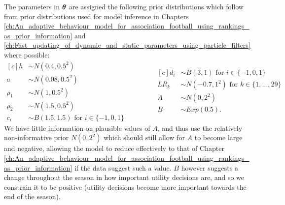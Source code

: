 The parameters in \(\boldsymbol{\theta}\) are assigned the following prior distributions which follow from prior distributions
used for model inference in Chapters
\ref{ch:An_adaptive_behaviour_model_for_association_football_using_rankings_as_prior_information} and
\ref{ch:Fast_updating_of_dynamic_and_static_parameters_using_particle_filters} where possible:
\begin{equation}
\begin{aligned}[c]
h &\sim N(0.4, 0.5^2) \\
a &\sim N(0.08, 0.5^2) \\
\rho_1 &\sim N(1, 0.5^2) \\
\rho_2 &\sim N(1.5, 0.5^2) \\
c_i &\sim B(1.5, 1.5) \text{ for } i \in \{-1, 0, 1\}
\end{aligned}
\qquad\qquad
\begin{aligned}[c]
d_i &\sim B(3, 1) \text{ for } i \in \{-1, 0, 1\} \\
LR_k &\sim N(-0.7, 1^2) \text{ for } k \in \{1, \ldots, 29\} \\
A &\sim N(0, 2^2) \\
B &\sim Exp(0.5).
\end{aligned}
\end{equation}
We have little information on plausible values of \(A\), and thus use the relatively non-informative prior \(N(0, 2^2)\)
which should still allow for \(A\) to become large and negative, allowing the model to reduce effectively to that of
Chapter \ref{ch:An_adaptive_behaviour_model_for_association_football_using_rankings_as_prior_information} if the data
suggest such a value. \(B\) however suggests a change throughout the season in how important utility decisions are, and
so we constrain it to be positive (utility decisions become more important towards the end of the season).


